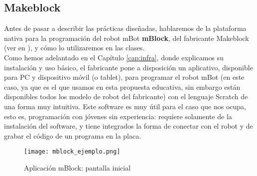 \subsection{Makeblock}\label{subsec:makeblock}
Antes de pasar a describir las prácticas diseñadas, hablaremos de la plataforma nativa para la programación del robot mBot \textbf{mBlock}, del fabricante Makeblock (ver en \cite{makeblock}), y cómo lo utilizaremos en las clases. \\
Como hemos adelantado en el Capítulo \ref{cap:infra}, donde explicamos su instalación y uso básico, el fabricante pone a disposición un aplicativo, disponible para PC y dispositivo móvil (o tablet), para programar el robot mBot (en este caso, ya que es el que usamos en esta propuesta educativa, sin embargo están disponibles todos los modelo de robot del fabricante) con el lenguaje Scratch de una forma muy intuitiva. Este software es muy útil para el caso que nos ocupa, esto es, programación con jóvenes sin experiencia: requiere solamente de la instalación del software, y tiene integrados la forma de conectar con el robot y de grabar el código de un programa en la placa. \\
\begin{figure}[h]
	\centering
	\texttt{[image: mblock\_ejemplo.png]}
	\label{img:pantallamblock}
	\caption{Aplicación mBlock: pantalla inicial}
\end{figure}

